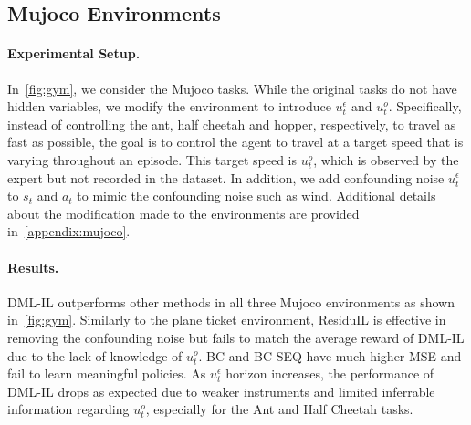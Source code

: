 \subsection{Mujoco Environments}
\paragraph{Experimental Setup.} 
In~\cref{fig:gym}, we consider the Mujoco tasks. While the original tasks do not have hidden variables, we modify the environment to introduce $u^\epsilon_t$ and $u^o_t$. Specifically, instead of controlling the ant, half cheetah and hopper, respectively, to travel as fast as possible, the goal is to control the agent to travel at a target speed that is varying throughout an episode. This target speed is $u^o_t$, which is observed by the expert but not recorded in the dataset. In addition, we add confounding noise $u^\epsilon_t$ to $s_t$ and $a_t$ to mimic the confounding noise such as wind. Additional details about the modification made to the environments are provided in~\cref{appendix:mujoco}.
\vspace{-10pt}
\paragraph{Results.}
DML-IL outperforms other methods in all three Mujoco environments as shown in~\cref{fig:gym}. Similarly to the plane ticket environment, ResiduIL is effective in removing the confounding noise but fails to match the average reward of DML-IL due to the lack of knowledge of $u^o_t$. BC and BC-SEQ have much higher MSE and fail to learn meaningful policies. As $u^\epsilon_t$ horizon increases, the performance of DML-IL drops as expected due to weaker instruments and limited inferrable information regarding $u^o_t$, especially for the Ant and Half Cheetah tasks.


